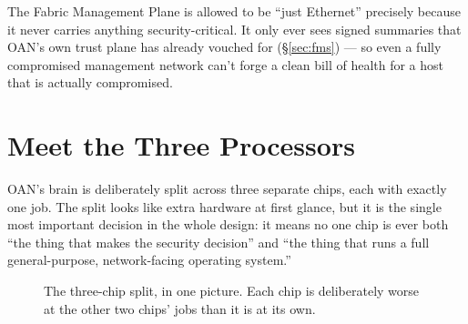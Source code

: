 \documentclass[11pt,a4paper]{article}
\newcommand{\figcap}[1]{\caption{#1}}
\begin{document}
\begin{plainbox}
The Fabric Management Plane is allowed to be ``just Ethernet'' precisely
because it never carries anything security-critical. It only ever sees
signed summaries that OAN's own trust plane has already vouched for
(\S\ref{sec:fms}) --- so even a fully compromised management network
can't forge a clean bill of health for a host that is actually
compromised.
\end{plainbox}

\section{Meet the Three Processors}
\label{sec:three-chips}

OAN's brain is deliberately split across three separate chips, each
with exactly one job. The split looks like extra hardware at first
glance, but it is the single most important decision in the whole
design: it means no one chip is ever both ``the thing that makes the
security decision'' and ``the thing that runs a full general-purpose,
network-facing operating system.''

\begin{figure}[h!]
\centering
{}
\figcap{The three-chip split, in one picture. Each chip is deliberately worse at the other two chips' jobs than it is at its own.}
\label{fig:threechips}
\end{figure}
\end{document}
